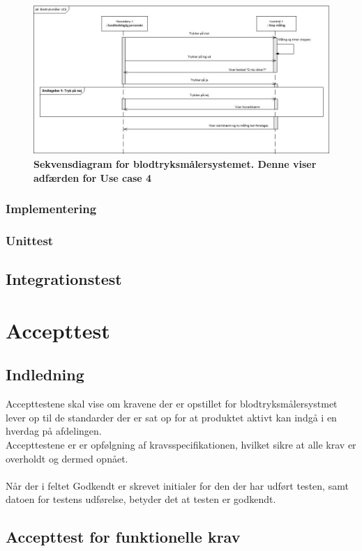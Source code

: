 \begin{figure}[h!]
\includegraphics[width =1.0\textwidth , center]{billeder/sdUC4}
\caption{\textbf{Sekvensdiagram for blodtryksmålersystemet. Denne viser adfærden for Use case 4}}
\end{figure}

\subsection{Implementering}
\subsection{Unittest}
\section{Integrationstest}


\chapter{Accepttest}
\section{Indledning}
Accepttestene skal vise om kravene der er opstillet for blodtryksmålersystmet lever op til de standarder der er sat op for at produktet aktivt kan indgå i en hverdag på afdelingen.\\
Accepttestene er er opfølgning af kravsspecifikationen, hvilket sikre at alle krav er overholdt og dermed opnået.\\\\
Når der i feltet Godkendt er skrevet initialer for den der har udført testen, samt datoen for testens udførelse, betyder det at testen er godkendt.  \\

\section{Accepttest for funktionelle krav}
